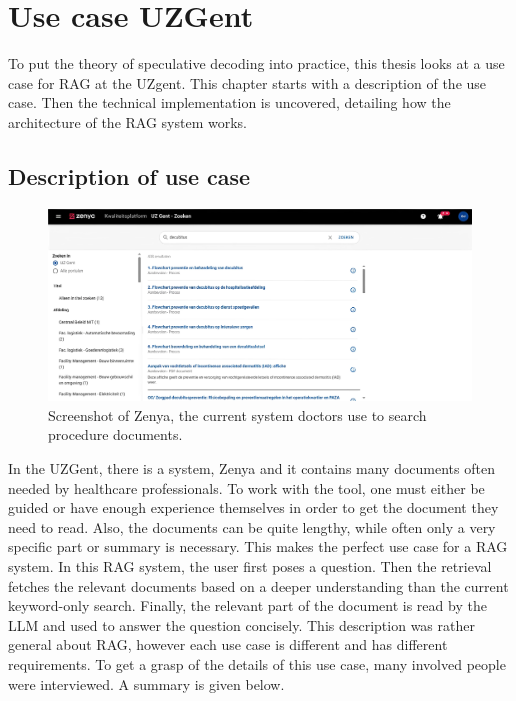 
\chapter{Use case UZGent}
\label{sec:use_case_uzgent}
To put the theory of speculative decoding into practice, this thesis looks at a use case for RAG at the UZgent. This chapter starts with a description of the use case. Then the technical implementation is uncovered, detailing how the architecture of the RAG system works.

\section{Description of use case}

\begin{figure}[h]
	\centering
	\includegraphics[width=\linewidth]{fig/zenya.png}
	\caption{Screenshot of Zenya, the current system doctors use to search procedure documents.}
	\label{fig:zenya}
\end{figure}

In the UZGent, there is a system, Zenya and it contains many documents often needed by healthcare professionals. To work with the tool, one must either be guided or have enough experience themselves in order to get the document they need to read. Also, the documents can be quite lengthy, while often only a very specific part or summary is necessary. This makes the perfect use case for a RAG system. In this RAG system, the user first poses a question. Then the retrieval fetches the relevant documents based on a deeper understanding than the current keyword-only search. Finally, the relevant part of the document is read by the LLM and used to answer the question concisely. This description was rather general about RAG, however each use case is different and has different requirements. To get a grasp of the details of this use case, many involved people were interviewed. A summary is given below.

